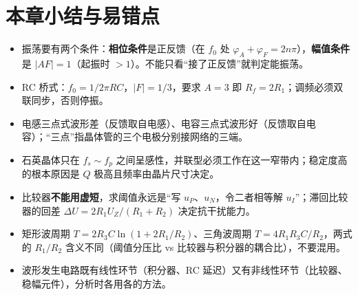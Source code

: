 \section{本章小结与易错点}
\begin{itemize}
    \item 振荡要有两个条件：\textbf{相位条件}是正反馈（在 $f_0$ 处 $\varphi_A+\varphi_F=2n\pi$），\textbf{幅值条件}是 $|AF|=1$（起振时 $>1$）。不能只看“接了正反馈”就判定能振荡。
    \item RC 桥式：$f_0=1/2\pi RC$，$|F|=1/3$，要求 $A=3$ 即 $R_f=2R_1$；调频必须双联同步，否则停振。
    \item 电感三点式波形差（反馈取自电感）、电容三点式波形好（反馈取自电容）；“三点”指晶体管的三个电极分别接网络的三端。
    \item 石英晶体只在 $f_s\sim f_p$ 之间呈感性，并联型必须工作在这一窄带内；稳定度高的根本原因是 $Q$ 极高且频率由晶片尺寸决定。
    \item 比较器\textbf{不能用虚短}，求阈值永远是“写 $u_P$、$u_N$，令二者相等解 $u_I$”；滞回比较器的回差 $\Delta U=2R_1U_Z/(R_1+R_2)$ 决定抗干扰能力。
    \item 矩形波周期 $T=2R_3C\ln(1+2R_1/R_2)$、三角波周期 $T=4R_1R_3C/R_2$，两式的 $R_1/R_2$ 含义不同（阈值分压比 vs 比较器与积分器的耦合比），不要混用。
    \item 波形发生电路既有线性环节（积分器、RC 延迟）又有非线性环节（比较器、稳幅元件），分析时各用各的方法。
\end{itemize}
